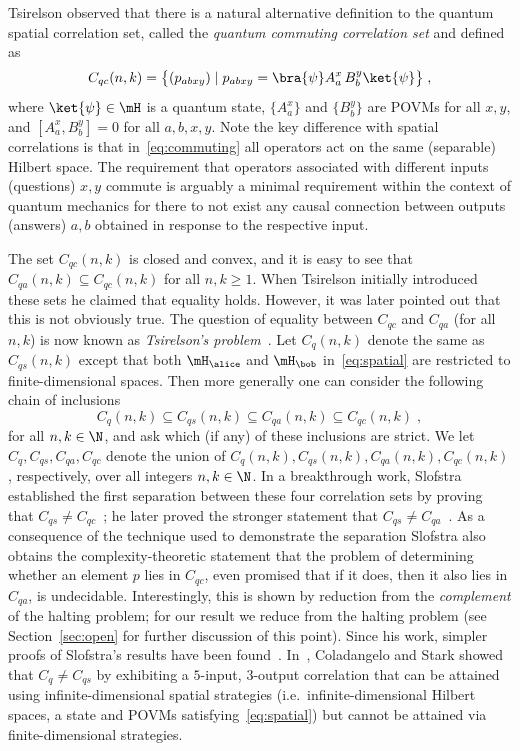 Tsirelson observed that there is a natural alternative definition to the quantum
spatial correlation set, called the \emph{quantum commuting correlation set} and
defined as
\begin{equation}
  \label{eq:commuting}
  C_{qc}(n,k) = \bigl\{ (p_{abxy}) \mid p_{abxy} = \bra{\psi} A^x_a\,  B^y_b
  \ket{\psi} \bigr\}\;,
\end{equation}
where $\ket{\psi}\in \mH$ is a quantum state, $\{A^x_a\}$ and $\{B^y_b\}$ are
POVMs for all $x, y$, and $[A^x_a, B^y_b] = 0$ for all $a, b, x, y$.
Note the key difference with spatial correlations is that
in~\eqref{eq:commuting} all operators act on the same (separable) Hilbert space.
The requirement that operators associated with different inputs (questions)
$x,y$ commute is arguably a minimal requirement within the context of quantum
mechanics for there to not exist any causal connection between outputs (answers)
$a,b$ obtained in response to the respective input.

The set $C_{qc}(n,k)$ is closed and convex, and it is easy to see that $C_{qa}(n,k)\subseteq C_{qc}(n,k)$ for all $n,k\geq 1$. When Tsirelson initially introduced these sets he claimed that equality holds. However, it was later pointed out that this is not obviously true. The question of equality between $C_{qc}$ and $C_{qa}$ (for all $n,k$) is now known as \emph{Tsirelson's problem}~\cite{Tsi06}. Let $	C_q(n,k) $ denote the same as $C_{qs}(n,k)$ except that both $\mH_\alice$ and $\mH_{\bob}$ in~\eqref{eq:spatial} are restricted to finite-dimensional spaces. Then more generally one can consider the following chain of inclusions
\begin{equation}
\label{eq:corr-sets-chain}
	C_q(n,k) \subseteq C_{qs}(n,k) \subseteq C_{qa}(n,k) \subseteq C_{qc}(n,k)\;,
\end{equation}
for all $n,k \in \N$, and ask which (if any) of these inclusions are strict. We let $C_q,C_{qs},C_{qa},C_{qc}$ denote the union of $C_q(n,k),C_{qs}(n,k),C_{qa}(n,k),C_{qc}(n,k)$, respectively, over all integers $n,k \in \N$. 
In a breakthrough work, Slofstra established the first separation between these four correlation sets by proving that $C_{qs} \neq C_{qc}$~\cite{slofstra2019tsirelson}; he later proved the stronger statement that $C_{qs} \neq C_{qa}$~\cite{slofstra2019set}. As a consequence of the technique used to demonstrate the separation Slofstra also obtains the complexity-theoretic statement that the problem of determining whether an element $p$ lies in $C_{qc}$, even promised that if it does, then it also lies in $C_{qa}$, is undecidable. Interestingly, this is shown by reduction from the \emph{complement} of the halting problem; for our result we reduce from the halting problem (see Section~\ref{sec:open} for further discussion of this point). 
Since his work, simpler proofs of Slofstra's results have been found~\cite{dykema2019non,musat2018non,coladangelo2019two}. In~\cite{coladangelo2018unconditional}, Coladangelo and Stark showed that $C_{q} \neq C_{qs}$ by exhibiting a $5$-input, $3$-output correlation that can be attained using infinite-dimensional spatial strategies (i.e.\ infinite-dimensional Hilbert spaces, a state and POVMs satisfying~\eqref{eq:spatial}) but cannot be attained via finite-dimensional strategies.

